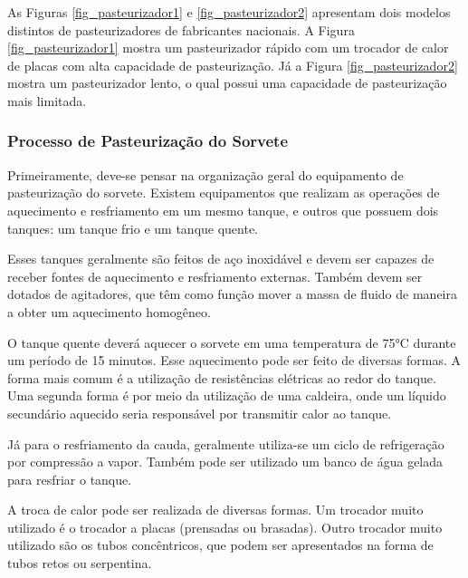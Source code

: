 \documentclass[10pt,a4paper]{article}
\begin{document}
As Figuras \ref{fig_pasteurizador1} e \ref{fig_pasteurizador2} apresentam dois modelos distintos de pasteurizadores de fabricantes nacionais. A Figura \ref{fig_pasteurizador1} mostra um pasteurizador rápido com um trocador de calor de placas com alta capacidade de pasteurização. Já a Figura \ref{fig_pasteurizador2} mostra um pasteurizador lento, o qual possui uma capacidade de pasteurização mais limitada.

\subsubsection{{ Processo de Pasteurização do Sorvete}}

Primeiramente, deve-se pensar na organização geral do equipamento de pasteurização do sorvete. Existem equipamentos que realizam as operações de aquecimento e resfriamento em um mesmo tanque, e outros que possuem dois tanques: um tanque frio e um tanque quente. 

Esses tanques geralmente são feitos de aço inoxidável e devem ser capazes de receber fontes de aquecimento e resfriamento externas. Também devem ser dotados de agitadores, que têm como função mover a massa de fluido de maneira a obter um aquecimento homogêneo. 

O tanque quente deverá aquecer o sorvete em uma temperatura de 75°C durante um período de 15 minutos. Esse aquecimento pode ser feito de diversas formas. A forma mais comum é a utilização de resistências elétricas ao redor do tanque. Uma segunda forma é por meio da utilização de uma caldeira, onde um líquido secundário aquecido seria responsável por transmitir calor ao tanque.
	
	
Já para o resfriamento da cauda, geralmente utiliza-se um ciclo de refrigeração por compressão a vapor. Também pode ser utilizado um banco de água gelada para resfriar o tanque.
	
A troca de calor pode ser realizada de diversas formas. Um trocador muito utilizado é o trocador a placas (prensadas ou brasadas). Outro trocador muito utilizado são os tubos concêntricos, que podem ser apresentados na forma de tubos retos ou serpentina.
 
\end{document}
